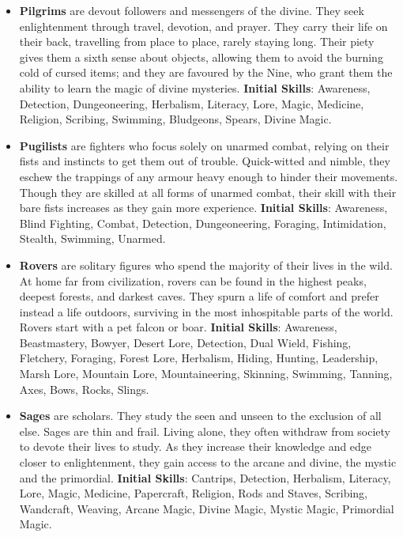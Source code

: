 \begin{itemize}
\item {\bf Pilgrims} are devout followers and messengers of the divine.  
They seek enlightenment through travel, devotion, and prayer.  They carry 
their life on their back, travelling from place to place, rarely staying 
long.  Their piety gives them a sixth sense about objects, allowing them
to avoid the burning cold of cursed items; and they are favoured by the Nine, 
who grant them the ability to learn the magic of divine mysteries.
\textbf{Initial Skills}: Awareness, Detection, Dungeoneering, Herbalism,
Literacy, Lore, Magic, Medicine, Religion, Scribing, Swimming, Bludgeons, 
Spears, Divine Magic.

\item {\bf Pugilists} are fighters who focus solely on unarmed combat, 
relying on their fists and instincts to get them out of trouble.  
Quick-witted and nimble, they eschew the trappings of any armour heavy 
enough to hinder their movements.  Though they are skilled at all forms of
unarmed combat, their skill with their bare fists increases as they gain
more experience.  \textbf{Initial Skills}: Awareness, Blind Fighting, 
Combat, Detection, Dungeoneering, Foraging, Intimidation, Stealth, 
Swimming, Unarmed.

\item {\bf Rovers} are solitary figures who spend the majority of their 
lives in the wild.  At home far from civilization, rovers can be found in 
the highest peaks, deepest forests, and darkest caves.  They spurn a life 
of comfort and prefer instead a life outdoors, surviving in the most 
inhospitable parts of the world.  Rovers start with a pet falcon or boar.
\textbf{Initial Skills}: Awareness, Beastmastery, Bowyer, Desert Lore, 
Detection, Dual Wield, Fishing, Fletchery, Foraging, Forest Lore, Herbalism, 
Hiding, Hunting, Leadership, Marsh Lore, Mountain Lore, Mountaineering, 
Skinning, Swimming, Tanning, Axes, Bows, Rocks, Slings.

\item {\bf Sages} are scholars.  They study the seen and unseen to the 
exclusion of all else.  Sages are thin and frail.  Living alone, they often
withdraw from society to devote their lives to study.  As they increase 
their knowledge and edge closer to enlightenment, they gain access to the 
arcane and divine, the mystic and the primordial.  \textbf{Initial Skills}:
Cantrips, Detection, Herbalism, Literacy, Lore, Magic, Medicine, Papercraft,
Religion, Rods and Staves, Scribing, Wandcraft, Weaving, Arcane Magic, 
Divine Magic, Mystic Magic, Primordial Magic.


\end{itemize}
